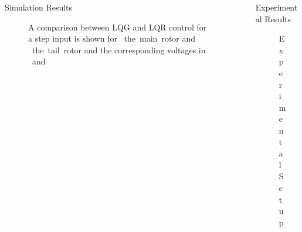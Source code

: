 \documentclass[final]{beamer}
\newlength{\sepwid}
\newlength{\onecolwid}
\begin{document}
\begin{frame}[t]
\begin{columns}[t]
\begin{column}{\onecolwid}
\begin{block}{Simulation Results}
\begin{figure}
{    \label{fig:simYawVolt}
    }
    \caption{A comparison between LQG and LQR control for a step input is shown for ~the~main~rotor and ~the~tail~rotor and the corresponding voltages in ~and~}
    \label{fig:simResults}
\end{figure}
\vskip -2cm
\end{block}


\end{column} %

\begin{column}{\sepwid}\end{column}

\begin{column}{\onecolwid} %


\begin{block}{Experimental Results}
\vskip -1cm
\begin{figure}
    \centering
    \caption{Experimental Setup}
    \label{fig:Setup}
\end{figure}


\end{block}
\end{column}
\end{columns}
\end{frame}
\end{document}
